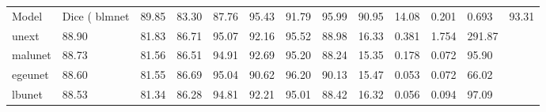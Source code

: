\begin{tabular}{llllllllllll}
\toprule
Model & Dice (%
\midrule
blmnet & 89.85 & 83.30 & 87.76 & 95.43 & 91.79 & 95.99 & 90.95 & 14.08 & 0.201 & 0.693 & 93.31 \\
unext & 88.90 & 81.83 & 86.71 & 95.07 & 92.16 & 95.52 & 88.98 & 16.33 & 0.381 & 1.754 & 291.87 \\
malunet & 88.73 & 81.56 & 86.51 & 94.91 & 92.69 & 95.20 & 88.24 & 15.35 & 0.178 & 0.072 & 95.90 \\
egeunet & 88.60 & 81.55 & 86.69 & 95.04 & 90.62 & 96.20 & 90.13 & 15.47 & 0.053 & 0.072 & 66.02 \\
lbunet & 88.53 & 81.34 & 86.28 & 94.81 & 92.21 & 95.01 & 88.42 & 16.32 & 0.056 & 0.094 & 97.09 \\
\bottomrule
\end{tabular}
